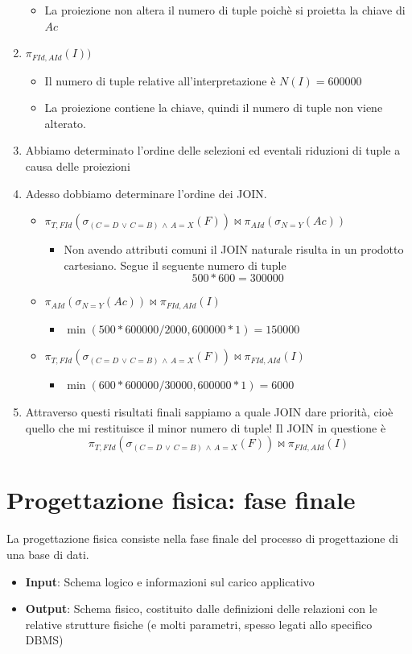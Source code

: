 \begin{enumerate}
\begin{itemize}
		\item La proiezione non altera il numero di tuple poichè si proietta la chiave di $Ac$
	\end{itemize}
	\item $\pi_{FId,AId}(I))$
	\begin{itemize}
		\item Il numero di tuple relative all'interpretazione è $N(I)=\boxed{600000}$
		\item La proiezione contiene la chiave, quindi il numero di tuple non viene alterato.
	\end{itemize}
	\item Abbiamo determinato l'ordine delle selezioni ed eventali riduzioni di tuple a causa delle proiezioni
	\item Adesso dobbiamo determinare l'ordine dei JOIN. 
	\begin{itemize}
		\item $\pi_{T,FId}(\sigma_{(C=D\,\lor\,C=B)\,\land\,A=X}(F)) \Join \pi_{AId}(\sigma_{N=Y}(Ac))$
		\begin{itemize}
			\item Non avendo attributi comuni il JOIN naturale risulta in un prodotto cartesiano. Segue il seguente numero di tuple
			\[500*600=300000\]
		\end{itemize}
		\item $\pi_{AId}(\sigma_{N=Y}(Ac)) \Join \pi_{FId,AId}(I)$
		\begin{itemize}
			\item $\min(500*600000/2000, 600000*1)=150000$
		\end{itemize}
		\item $\pi_{T,FId}(\sigma_{(C=D\,\lor\,C=B)\,\land\,A=X}(F))  \Join \pi_{FId,AId}(I)$
		\begin{itemize}
			\item $\min(600*600000/30000, 600000*1)=6000$
		\end{itemize}
	\end{itemize}
	\item Attraverso questi risultati finali sappiamo a quale JOIN dare priorità, cioè quello che mi restituisce il minor numero di tuple! Il JOIN in questione è
	\[\pi_{T,FId}(\sigma_{(C=D\,\lor\,C=B)\,\land\,A=X}(F))  \Join \pi_{FId,AId}(I)\]
\end{enumerate}
\section{Progettazione fisica: fase finale}
La progettazione fisica consiste nella fase finale del processo di progettazione di una base di dati.
\begin{itemize}
	\item \textbf{Input}: Schema logico e informazioni sul carico applicativo
	\item \textbf{Output}: Schema fisico, costituito dalle definizioni delle relazioni con le relative strutture fisiche (e molti parametri, spesso legati allo specifico DBMS)
\end{itemize}

